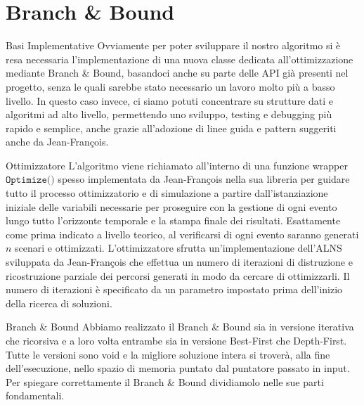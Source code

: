 \documentclass[10pt]{beamer}
\begin{document}
    \section{Branch \& Bound}\label{sec:branch-and-bound}
    \begin{frame}{Basi Implementative}
        Ovviamente per poter sviluppare il nostro algoritmo si è resa necessaria l'implementazione di una nuova classe dedicata all'ottimizzazione mediante Branch \& Bound, basandoci anche su parte delle API già presenti nel progetto, senza le quali sarebbe stato necessario un lavoro molto più a basso livello. In questo caso invece, ci siamo potuti concentrare su strutture dati e algoritmi ad alto livello, permettendo uno sviluppo, testing e debugging più rapido e semplice, anche grazie all'adozione di linee guida e pattern suggeriti anche da Jean-François.
    \end{frame}

    \begin{frame}{Ottimizzatore}
        L'algoritmo viene richiamato all'interno di una funzione wrapper $\texttt{Optimize()}$ spesso implementata da Jean-François nella sua libreria per guidare tutto il processo ottimizzatorio e di simulazione a partire dall'istanziazione iniziale delle variabili necessarie per proseguire con la gestione di ogni evento lungo tutto l'orizzonte temporale e la stampa finale dei risultati. Esattamente come prima indicato a livello teorico, al verificarsi di ogni evento saranno generati $n$ scenari e ottimizzati. L'ottimizzatore sfrutta un'implementazione dell'ALNS \cite{Ropke} sviluppata da Jean-François che effettua un numero di iterazioni di distruzione e ricostruzione parziale dei percorsi generati in modo da cercare di ottimizzarli. Il numero di iterazioni è specificato da un parametro impostato prima dell'inizio della ricerca di soluzioni.
    \end{frame}

    \begin{frame}{Branch \& Bound}
        Abbiamo realizzato il Branch \& Bound sia in versione iterativa che ricorsiva e a loro volta entrambe sia in versione Best-First che Depth-First. Tutte le versioni sono void e la migliore soluzione intera si troverà, alla fine dell'esecuzione, nello spazio di memoria puntato dal puntatore passato in input. Per spiegare correttamente il Branch \& Bound dividiamolo nelle sue parti fondamentali.
    \end{frame}
\end{document}
